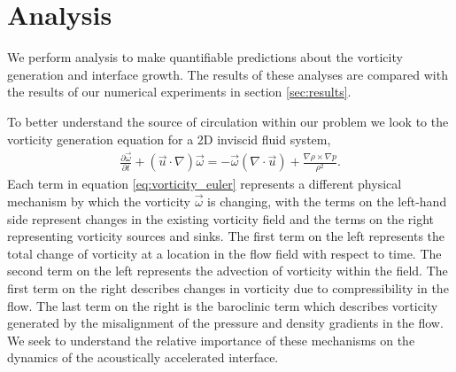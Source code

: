 \section{Analysis}%
\label{sec:analysis}%
We perform analysis to make quantifiable predictions about the
vorticity generation and interface growth. The results of these
analyses are compared with the results of our numerical experiments in
section \ref{sec:results}.

To better understand the source of circulation within our problem we
look to the vorticity generation equation for a 2D inviscid fluid
system,
\begin{align} \label{eq:vorticity_euler}
  \frac{\partial \vec{\omega}}{\partial t}+\left(\vec{u}\cdot\nabla\right)\vec{\omega} =%
  - \vec{\omega}\left(\nabla\cdot\vec{u}\right) + \frac{\nabla\rho\times\nabla p}{\rho^2}.%
\end{align}
Each term in equation \eqref{eq:vorticity_euler} represents a
different physical mechanism by which the vorticity $\vec{\omega}$ is
changing, with the terms on the left-hand side represent changes in
the existing vorticity field and the terms on the right representing
vorticity sources and sinks. The first term on the left represents the
total change of vorticity at a location in the flow field with respect
to time. The second term on the left represents the advection of
vorticity within the field. The first term on the right describes
changes in vorticity due to compressibility in the flow. The last term
on the right is the baroclinic term which describes vorticity
generated by the misalignment of the pressure and density gradients in
the flow. We seek to understand the relative importance of these
mechanisms on the dynamics of the acoustically accelerated interface.

